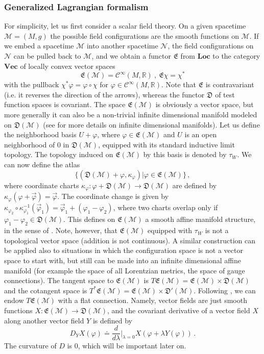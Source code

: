 \documentclass[12pt]{article}
\newcommand{\E}{\mathfrak{E}}
\newcommand{\D}{\mathfrak{D}}
\newcommand{\Ncal}{\mathcal{N}}
\newcommand{\Mcal}{\mathcal{M}}
\newcommand{\Loc}{\mathrm{\mathbf{Loc}}}       %
\newcommand{\Vect}{\mathrm{\mathbf{Vec}}}       %
\newcommand{\RR}{\mathbb{R}}           %
\newcommand{\al}{\alpha}
\newcommand{\la}{\lambda}
\newcommand{\ph}{\varphi}
\newcommand{\1}{\mathds{1}}                         %
\newcommand{\be}{\begin{equation}}
\newcommand{\ee}{\end{equation}}
\begin{document}
{\subsubsection{Generalized Lagrangian formalism}\label{genLagr}
For simplicity, let us first consider a scalar field theory. On a given spacetime $\mathcal{M}=(M,g)$ the possible field configurations are the smooth functions on $\Mcal$. If we embed a spacetime $\Mcal$ into another spacetime $\Ncal$, the field configurations on $\Ncal$ can be pulled back to 
$\Mcal$, and we obtain a functor $\mathfrak{E}$ from $\Loc$ to the category $\Vect$ of locally convex vector
spaces
\be
\mathfrak{E}(\Mcal)=\mathcal{C}^{\infty}(M,\RR)\ ,\ \mathfrak{E}\chi=\chi^*
\ee  
with the pullback $\chi^*\ph=\ph\circ\chi$ for $\ph\in\mathcal{C}^{\infty}(M,\RR)$. Note that $\mathfrak{E}$ is contravariant (i.e. it reverses the direction of the arrows), whereas the functor $\mathfrak{D}$ of test function spaces is covariant. The space $\mathfrak{E}(\Mcal)$ is obviously a vector space, but more generally it can also be a non-trivial infinite dimensional manifold modeled on $\mathfrak{D}(\mathcal{M})$ (see \cite{r11586,Michor,Neeb} for more details on infinite dimensional manifolds). Let us define the neighborhood basis $U+\ph$, where $\ph\in\E(\Mcal)$ and $U$ is an open neighborhood of $0$ in $\D(\Mcal)$, equipped with its standard inductive limit topology. The topology induced on $\E(\Mcal)$ by this basis is denoted by $\tau_W$. We can now define the atlas
\[
\{(\D(\Mcal)+\ph,\kappa_\ph)|\ph\in\E(\Mcal)\}\,,
\]
where coordinate charts $\kappa_\ph:\ph+\D(\Mcal)\rightarrow\D(\Mcal)$ are defined by $\kappa_\ph(\ph+\vec{\ph})=\vec{\ph}$. The coordinate change is given by $\kappa_{\ph_2}\circ\kappa_{\ph_1}^{-1}(\vec{\ph}_1)=\vec{\ph}_1+(\ph_1-\ph_2)$, where two charts overlap only if $\ph_1-\ph_2\in\D(\Mcal)$. This defines on $\E(\Mcal)$ a smooth affine manifold structure, in the sense of \cite{r11586}. Note, however, that $\E(\Mcal)$ equipped with $\tau_W$ is not a topological vector space (addition is not continuous). A similar construction can be applied also to situations in which the configuration space is not a vector space to start with, but still can be made into an infinite dimensional affine manifold (for example the space of all Lorentzian metrics, the space of gauge connections). The tangent space to  $\E(\Mcal)$ is  $T\E(\Mcal)=\E(\Mcal)\times \D(\Mcal)$ and the cotangent space is $T^*\E(\Mcal)=\E(\Mcal)\times \D'(\Mcal)$. Following \cite{BFR}, we can endow $T\E(\Mcal)$ with a flat connection.
Namely, vector fields are just smooth functions $X:\E(\Mcal)\to\D(\Mcal)$, 
and the covariant derivative of a vector field $X$ along another vector field $Y$ is defined by
\[
D_YX(\ph)\doteq\frac{d}{d\la}\Big|_{\la=0}X(\ph+\la Y(\ph))\,.
\]
The curvature of $D$ is 0, which will be important later on.

}
\end{document}
